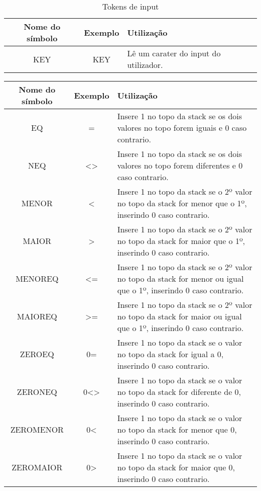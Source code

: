 \documentclass{article}
\begin{document}
\begin{table}[h]
    \centering
    \begin{tabular}{|c|c|p{6cm}|}
         \hline
         \textbf{Nome do símbolo}& \textbf{Exemplo} &\textbf{Utilização}\\
         \hline
         KEY& KEY& Lê um carater do input do utilizador.\\ 
         \hline 
    \end{tabular}
    \caption{Tokens de input}
    \label{tab:arit}
\end{table}

\begin{table}[h]
    \centering
    \begin{tabular}{|c|c|p{6cm}|}
         \hline
         \textbf{Nome do símbolo}& \textbf{Exemplo} &\textbf{Utilização}\\
         \hline
         EQ& =& Insere 1 no topo da stack se os dois valores no topo forem iguais e 0 caso contrario.\\ \hline 
         NEQ& \textless\textgreater & Insere 1 no topo da stack se os dois valores no topo forem diferentes e 0 caso contrario.\\ \hline 
         MENOR& \textless & Insere 1 no topo da stack se o 2º valor no topo da stack for menor que o 1º, inserindo 0 caso contrario.\\ \hline 
         MAIOR& \textgreater & Insere 1 no topo da stack se o 2º valor no topo da stack for maior que o 1º, inserindo 0 caso contrario.\\ \hline 
         MENOREQ& \textless= & Insere 1 no topo da stack se o 2º valor no topo da stack for menor ou igual que o 1º, inserindo 0 caso contrario.\\ \hline 
         MAIOREQ& \textgreater= & Insere 1 no topo da stack se o 2º valor no topo da stack for maior ou igual que o 1º, inserindo 0 caso contrario.\\ \hline 
         ZEROEQ& 0= & Insere 1 no topo da stack se o valor no topo da stack for igual a 0, inserindo 0 caso contrario.\\ \hline 
         ZERONEQ& 0\textless\textgreater& Insere 1 no topo da stack se o valor no topo da stack for diferente de 0, inserindo 0 caso contrario.\\ \hline 
         ZEROMENOR& 0\textless& Insere 1 no topo da stack se o valor no topo da stack for menor que 0, inserindo 0 caso contrario.\\ \hline 
         ZEROMAIOR& 0\textgreater& Insere 1 no topo da stack se o valor no topo da stack for maior que 0, inserindo 0 caso contrario.\\ \hline 

\end{tabular}
\end{table}
\end{document}
